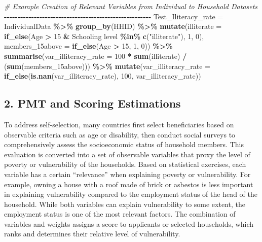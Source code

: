 \documentclass[
]{article}
\newenvironment{Shaded}{\begin{snugshade}}{\end{snugshade}}
\newcommand{\AttributeTok}[1]{\textcolor[rgb]{0.13,0.29,0.53}{#1}}
\newcommand{\CommentTok}[1]{\textcolor[rgb]{0.56,0.35,0.01}{\textit{#1}}}
\newcommand{\DecValTok}[1]{\textcolor[rgb]{0.00,0.00,0.81}{#1}}
\newcommand{\FunctionTok}[1]{\textcolor[rgb]{0.13,0.29,0.53}{\textbf{#1}}}
\newcommand{\NormalTok}[1]{#1}
\newcommand{\OtherTok}[1]{\textcolor[rgb]{0.56,0.35,0.01}{#1}}
\newcommand{\SpecialCharTok}[1]{\textcolor[rgb]{0.81,0.36,0.00}{\textbf{#1}}}
\newcommand{\StringTok}[1]{\textcolor[rgb]{0.31,0.60,0.02}{#1}}
\begin{document}
\begin{Shaded}
\begin{Highlighting}[]
\CommentTok{\# Example Creation of Relevant Variables from Individual to Household Datasets}
\SpecialCharTok{{-}{-}{-}{-}{-}{-}{-}{-}{-}{-}{-}{-}{-}{-}{-}{-}{-}{-}{-}{-}{-}{-}{-}{-}{-}{-}{-}{-}{-}{-}{-}{-}{-}{-}{-}{-}{-}{-}{-}{-}{-}{-}{-}{-}{-}{-}{-}{-}{-}{-}{-}{-}{-}{-}}
\NormalTok{Test\_Iliteracy\_rate }\OtherTok{=}\NormalTok{ IndividualData }\SpecialCharTok{\%\textgreater{}\%} \FunctionTok{group\_by}\NormalTok{(HHID) }\SpecialCharTok{\%\textgreater{}\%}
  \FunctionTok{mutate}\NormalTok{(}\AttributeTok{illiterate =} \FunctionTok{if\_else}\NormalTok{(Age }\SpecialCharTok{\textgreater{}} \DecValTok{15} \SpecialCharTok{\&} \StringTok{\textasciigrave{}}\AttributeTok{Schooling level}\StringTok{\textasciigrave{}} \SpecialCharTok{\%in\%} \FunctionTok{c}\NormalTok{(}\StringTok{"illiterate"}\NormalTok{), }\DecValTok{1}\NormalTok{, }\DecValTok{0}\NormalTok{),}
         \AttributeTok{members\_15above =} \FunctionTok{if\_else}\NormalTok{(Age }\SpecialCharTok{\textgreater{}} \DecValTok{15}\NormalTok{, }\DecValTok{1}\NormalTok{, }\DecValTok{0}\NormalTok{)) }\SpecialCharTok{\%\textgreater{}\%}
  \FunctionTok{summarise}\NormalTok{(}\AttributeTok{var\_illiteracy\_rate =} \DecValTok{100} \SpecialCharTok{*} \FunctionTok{sum}\NormalTok{(illiterate) }\SpecialCharTok{/}\NormalTok{ (}\FunctionTok{sum}\NormalTok{(members\_15above))) }\SpecialCharTok{\%\textgreater{}\%}
  \FunctionTok{mutate}\NormalTok{(}\AttributeTok{var\_illiteracy\_rate =} \FunctionTok{if\_else}\NormalTok{(}\FunctionTok{is.nan}\NormalTok{(var\_illiteracy\_rate), }\DecValTok{100}\NormalTok{, var\_illiteracy\_rate))}
\end{Highlighting}
\end{Shaded}

\subsection{2. PMT and Scoring
Estimations}\label{pmt-and-scoring-estimations}

To address self-selection, many countries first select beneficiaries
based on observable criteria such as age or disability, then conduct
social surveys to comprehensively assess the socioeconomic status of
household members. This evaluation is converted into a set of observable
variables that proxy the level of poverty or vulnerability of the
households. Based on statistical exercises, each variable has a certain
``relevance'' when explaining poverty or vulnerability. For example,
owning a house with a roof made of brick or asbestos is less important
in explaining vulnerability compared to the employment status of the
head of the household. While both variables can explain vulnerability to
some extent, the employment status is one of the most relevant factors.
The combination of variables and weights assigns a score to applicants
or selected households, which ranks and determines their relative level
of vulnerability.
\end{document}
